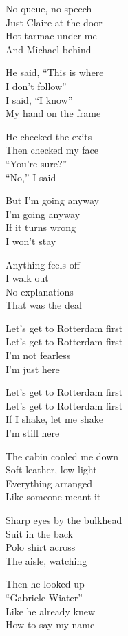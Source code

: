 \begin{lyrics}
No queue, no speech\\
Just Claire at the door\\
Hot tarmac under me\\
And Michael behind

He said, “This is where\\
I don’t follow”\\
I said, “I know”\\
My hand on the frame

He checked the exits\\
Then checked my face\\
“You’re sure?”\\
“No,” I said

But I’m going anyway\\
I’m going anyway\\
If it turns wrong\\
I won’t stay

Anything feels off\\
I walk out\\
No explanations\\
That was the deal

Let’s get to Rotterdam first\\
Let’s get to Rotterdam first\\
I’m not fearless\\
I’m just here

Let’s get to Rotterdam first\\
Let’s get to Rotterdam first\\
If I shake, let me shake\\
I’m still here

The cabin cooled me down\\
Soft leather, low light\\
Everything arranged\\
Like someone meant it

Sharp eyes by the bulkhead\\
Suit in the back\\
Polo shirt across\\
The aisle, watching

Then he looked up\\
“Gabriele Wiater”\\
Like he already knew\\
How to say my name


\end{lyrics}
